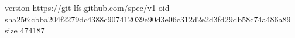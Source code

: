 version https://git-lfs.github.com/spec/v1
oid sha256:cbba204f2279dc4388c907412039e90d3e06c312d2e2d3fd29db58c74a486a89
size 474187
